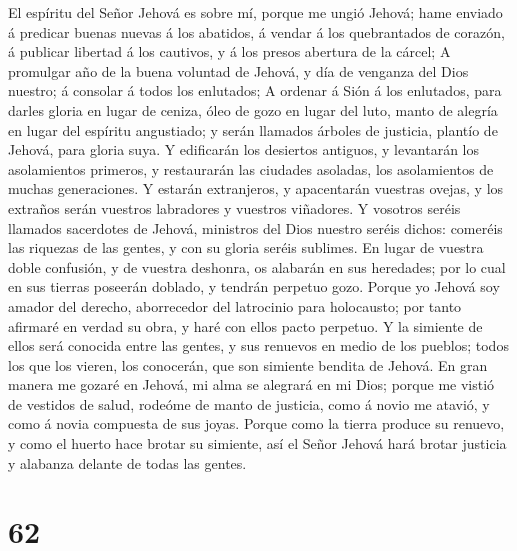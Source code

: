  El espíritu del Señor Jehová es sobre mí, porque me ungió
Jehová; hame enviado á predicar buenas nuevas á los abatidos, á vendar á
los quebrantados de corazón, á publicar libertad á los cautivos, y á los
presos abertura de la cárcel;  A promulgar año de la buena
voluntad de Jehová, y día de venganza del Dios nuestro; á consolar á
todos los enlutados;  A ordenar á Sión á los enlutados, para
darles gloria en lugar de ceniza, óleo de gozo en lugar del luto, manto
de alegría en lugar del espíritu angustiado; y serán llamados árboles de
justicia, plantío de Jehová, para gloria suya.  Y edificarán
los desiertos antiguos, y levantarán los asolamientos primeros, y
restaurarán las ciudades asoladas, los asolamientos de muchas
generaciones.  Y estarán extranjeros, y apacentarán vuestras
ovejas, y los extraños serán vuestros labradores y vuestros viñadores.
 Y vosotros seréis llamados sacerdotes de Jehová, ministros
del Dios nuestro seréis dichos: comeréis las riquezas de las gentes, y
con su gloria seréis sublimes.  En lugar de vuestra doble
confusión, y de vuestra deshonra, os alabarán en sus heredades; por lo
cual en sus tierras poseerán doblado, y tendrán perpetuo gozo.
 Porque yo Jehová soy amador del derecho, aborrecedor del
latrocinio para holocausto; por tanto afirmaré en verdad su obra, y haré
con ellos pacto perpetuo.  Y la simiente de ellos será
conocida entre las gentes, y sus renuevos en medio de los pueblos; todos
los que los vieren, los conocerán, que son simiente bendita de Jehová.
 En gran manera me gozaré en Jehová, mi alma se alegrará en
mi Dios; porque me vistió de vestidos de salud, rodeóme de manto de
justicia, como á novio me atavió, y como á novia compuesta de sus joyas.
 Porque como la tierra produce su renuevo, y como el huerto
hace brotar su simiente, así el Señor Jehová hará brotar justicia y
alabanza delante de todas las gentes.

\hypertarget{section-61}{%
\section{62}\label{section-61}}

